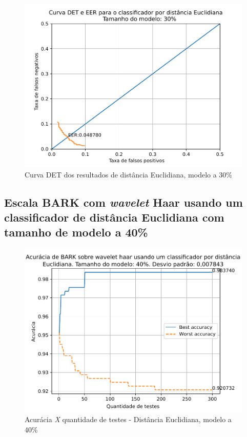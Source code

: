 			\begin{figure}[H]
				\centering
				\includegraphics[width=.6\linewidth]{images/results/det/DET_for_classifier_Euclidian_30}
				\caption{Curva DET dos resultados de distância Euclidiana, modelo a 30\%}
				\label{fig:detforclassifiereuclidian30}
			\end{figure}

			\FloatBarrier
		\subsection{Escala BARK com \textit{wavelet} Haar usando um classificador de distância Euclidiana com tamanho de modelo a 40\%}
		
			
			
			\begin{figure}[ht]
				\centering
				\includegraphics[width=.6\linewidth]{images/results/confusionMatrices/classifier_Euclidian_40}
				\caption{Acurácia \textit{X} quantidade de testes - Distância Euclidiana, modelo a 40\%}
				\label{fig:classifiereuclidian40}
			\end{figure}
		

